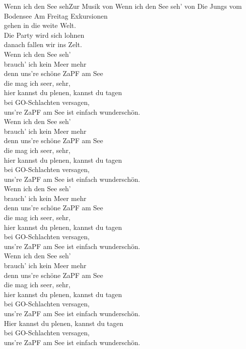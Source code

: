 \begin{lied}{Wenn ich den See seh}{Zur Musik von Wenn ich den See seh' von Die Jungs vom Bodensee}
Am Freitag Exkursionen\\
gehen in die weite Welt.\\
Die Party wird sich lohnen\\
danach fallen wir ins Zelt.\\
\vspace{1em}
Wenn ich den See seh'\\
brauch' ich kein Meer mehr\\
denn uns're schöne ZaPF am See\\
die mag ich seer, sehr,\\
hier kannst du plenen, kannst du tagen\\
bei GO-Schlachten versagen,\\
uns're ZaPF am See ist einfach wunderschön.\\
\vspace{1em}
Wenn ich den See seh'\\
brauch' ich kein Meer mehr\\
denn uns're schöne ZaPF am See\\
die mag ich seer, sehr,\\
hier kannst du plenen, kannst du tagen\\
bei GO-Schlachten versagen,\\
uns're ZaPF am See ist einfach wunderschön.\\
\vspace{1em}
Wenn ich den See seh'\\
brauch' ich kein Meer mehr\\
denn uns're schöne ZaPF am See\\
die mag ich seer, sehr,\\
hier kannst du plenen, kannst du tagen\\
bei GO-Schlachten versagen,\\
uns're ZaPF am See ist einfach wunderschön.\\
Wenn ich den See seh'\\
brauch' ich kein Meer mehr\\
denn uns're schöne ZaPF am See\\
die mag ich seer, sehr,\\
hier kannst du plenen, kannst du tagen\\
bei GO-Schlachten versagen,\\
uns're ZaPF am See ist einfach wunderschön.\\
\vspace{1em}
Hier kannst du plenen, kannst du tagen\\
bei GO-Schlachten versagen,\\
uns're ZaPF am See ist einfach wunderschön.\\
\end{lied}
